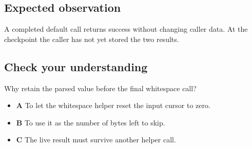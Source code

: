 \subsection{Expected observation}
A completed default call returns success without changing caller data. At the checkpoint the caller has not yet stored the two results.

\subsection{Check your understanding}
Why retain the parsed value before the final whitespace call?

\begin{itemize}
  \item \textbf{A} To let the whitespace helper reset the input cursor to zero.
  \item \textbf{B} To use it as the number of bytes left to skip.
  \item \textbf{C} The live result must survive another helper call.
\end{itemize}
